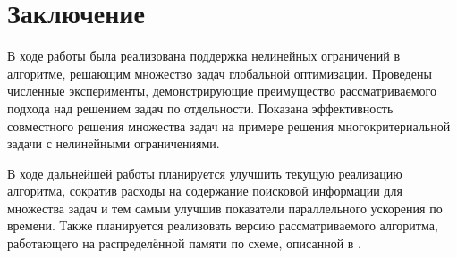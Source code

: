 \documentclass[11pt, oneside, a4paper]{article}
\begin{document}
\section{Заключение}

В ходе работы была реализована поддержка нелинейных ограничений в алгоритме, решающим
множество задач глобальной оптимизации. Проведены численные эксперименты, демонстрирующие
преимущество рассматриваемого подхода над решением задач по отдельности. Показана эффективность
совместного решения множества задач на примере решения многокритериальной задачи с
нелинейными ограничениями.

В ходе дальнейшей работы планируется улучшить текущую реализацию алгоритма,
сократив расходы на содержание поисковой информации для множества задач и тем самым улучшив
показатели параллельного ускорения по времени. Также планируется реализовать версию
рассматриваемого алгоритма, работающего на распределённой памяти по схеме, описанной в \cite{BarkalovLebedev2017_2}.


{}
\end{document}
